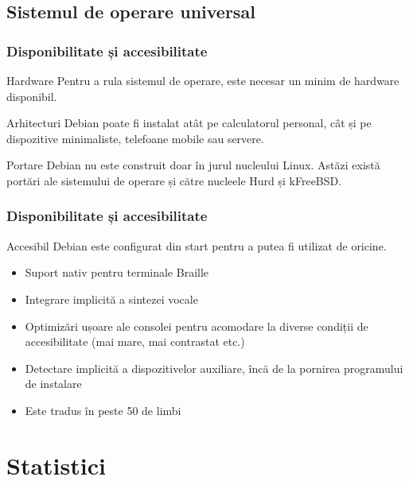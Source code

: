 \documentclass[xcolor=dvipsnames]{beamer}
\begin{document}
\subsection{Sistemul de operare universal}
\begin{frame}
\frametitle{Disponibilitate și accesibilitate}
\begin{block}
{Hardware}
Pentru a rula sistemul de operare, este necesar un minim de hardware disponibil.
\end{block}
\begin{block}
{Arhitecturi}
Debian poate fi instalat atât pe calculatorul personal, cât și pe dispozitive minimaliste, telefoane mobile sau servere.
\end{block}
\begin{block}
{Portare}
Debian nu este construit doar în jurul nucleului Linux. Astăzi există portări ale sistemului de operare și către nucleele Hurd și kFreeBSD.
\end{block}
\end{frame}
%
\begin{frame}
\frametitle{Disponibilitate și accesibilitate}
\begin{block}
{Accesibil}
Debian este configurat din start pentru a putea fi utilizat de oricine.\\
\begin{itemize}
\item Suport nativ pentru terminale Braille
\item Integrare implicită a sintezei vocale
\item Optimizări ușoare ale consolei pentru acomodare la diverse condiții de accesibilitate (mai mare, mai contrastat etc.)
\item Detectare implicită a dispozitivelor auxiliare, încă de la pornirea programului de instalare
\item Este tradus în peste 50 de limbi
\end{itemize}
\end{block}
\end{frame}

\section{Statistici}
\end{document}
